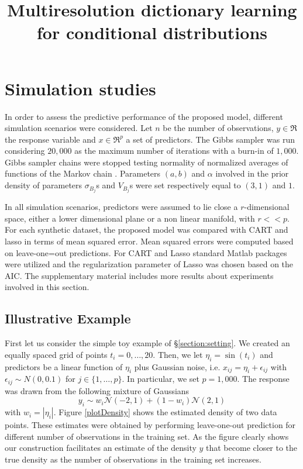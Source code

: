 \documentclass{article} %
\title{Multiresolution dictionary learning for conditional distributions}
\begin{document}
\maketitle



\section{Simulation studies}\label{section:simulation}

In order to assess the predictive performance of the proposed model, different simulation scenarios were considered. Let $n$ be the number of observations, $y \in \Re$ the response variable and $x \in \Re^p$ a set of predictors. The Gibbs sampler was run considering $20,000$ as the maximum number of iterations with a burn-in of $1,000$. Gibbs sampler chains were stopped testing normality of normalized averages of functions of the Markov chain \cite{Chauveau98anautomated}. Parameters $(a,b)$ and $\alpha$ involved in the prior density of parameters $\sigma_{B_j}$s and $V_{B_j}$s were set respectively equal to $(3,1)$ and $1$.

In all simulation scenarios, predictors were assumed to lie close a $r$-dimensional space, either a lower dimensional plane or a non linear manifold, with $r<<p$. For each synthetic dataset, the proposed model was compared with CART and lasso in terms of mean squared error. Mean squared errors were computed based on leave-one=out predictions. For CART and Lasso standard Matlab packages were utilized and the regularization parameter of Lasso was chosen based on  the AIC. The supplementary material includes more results about experiments involved in this section.

\subsection{Illustrative Example}

First let us consider the simple toy example of \S \ref{section:setting}. We created an equally spaced grid of points $t_i=0, \ldots, 20$. Then, we let $\eta_i=\sin(t_i)$ and predictors be a linear function of $\eta_i$ plus Gaussian noise, i.e. $x_{ij}=\eta_i + \epsilon_{ij}$ with $\epsilon_{ij} \sim N(0,0.1)$ for $j\in \{1, \ldots, p \}$. In particular, we set $p=1,000$. The response was drawn from the following mixture of Gaussians
\begin{equation}
y_i \sim w_i \mathcal{N}(-2,1) + (1-w_i) \mathcal{N}(2,1) 
\end{equation}
with $w_i=|\eta_i|$.  Figure \ref{plotDensity} shows the estimated density of two data points. These estimates were obtained by performing leave-one-out prediction for different number of observations in the training set. As the figure clearly shows our construction facilitates an estimate of the density $y$ that become closer to the true density as the number of observations in the training set increases.
\end{document}
